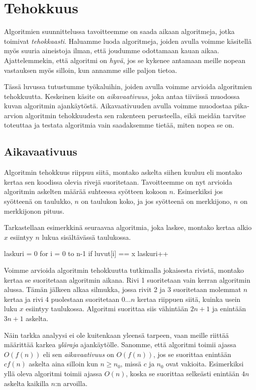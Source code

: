 \chapter{Tehokkuus}

Algoritmien suunnittelussa tavoitteemme on saada aikaan
algoritmeja, jotka toimivat \emph{tehokkaasti}.
Haluamme luoda algoritmeja, joiden avulla voimme
käsitellä myös suuria aineistoja ilman, että joudumme
odottamaan kauan aikaa.
Ajattelemmekin, että algoritmi on \emph{hyvä},
jos se kykenee antamaan meille nopean vastauksen myös silloin,
kun annamme sille paljon tietoa.

Tässä luvussa tutustumme työkaluihin, joiden avulla
voimme arvioida algoritmien tehokkuutta.
Keskeinen käsite on \emph{aikavaativuus}, joka antaa
tiiviissä muodossa kuvan algoritmin ajankäytöstä.
Aikavaativuuden avulla voimme muodostaa pika-arvion
algoritmin tehokkuudesta sen rakenteen perusteella,
eikä meidän tarvitse toteuttaa ja testata algoritmia
vain saadaksemme tietää, miten nopea se on.

\section{Aikavaativuus}

Algoritmin tehokkuus riippuu siitä,
montako askelta siihen kuuluu eli
montako kertaa sen koodissa olevia rivejä suoritetaan.
Tavoitteemme on nyt arvioida algoritmin askelten määrää
suhteessa syötteen kokoon $n$.
Esimerkiksi jos syötteenä on taulukko,
$n$ on taulukon koko,
ja jos syötteenä on merkkijono,
$n$ on merkkijonon pituus.

Tarkastellaan esimerkkinä seuraavaa algoritmia,
joka laskee, montako kertaa alkio $x$ esiintyy
$n$ lukua sisältävässä taulukossa.

\begin{code}[numbers=left]
laskuri = 0
for i = 0 to n-1
    if luvut[i] == x
        laskuri++
\end{code}

Voimme arvioida algoritmin tehokkuutta tutkimalla
jokaisesta rivistä, montako kertaa se suoritetaan algoritmin aikana.
Rivi 1 suoritetaan vain kerran algoritmin alussa.
Tämän jälkeen alkaa silmukka, jossa
rivit 2 ja 3 suoritetaan molemmat $n$ kertaa
ja rivi 4 puolestaan suoritetaan $0 \dots n$
kertaa riippuen siitä, kuinka usein
luku $x$ esiintyy taulukossa.
Algoritmi suorittaa siis vähintään $2n+1$ ja enintään $3n+1$
askelta.

Näin tarkka analyysi ei ole kuitenkaan yleensä tarpeen,
vaan meille riittää määrittää karkea \emph{yläraja} ajankäytölle.
Sanomme, että algoritmi toimii ajassa $O(f(n))$ eli sen
\emph{aikavaativuus} on $O(f(n))$, jos se suorittaa
enintään $c f(n)$ askelta aina silloin kun $n \ge n_0$,
missä $c$ ja $n_0$ ovat vakioita.
Esimerkiksi yllä oleva algoritmi toimii ajassa $O(n)$,
koska se suorittaa selkeästi enintään $4n$ askelta
kaikilla $n$:n arvoilla.

